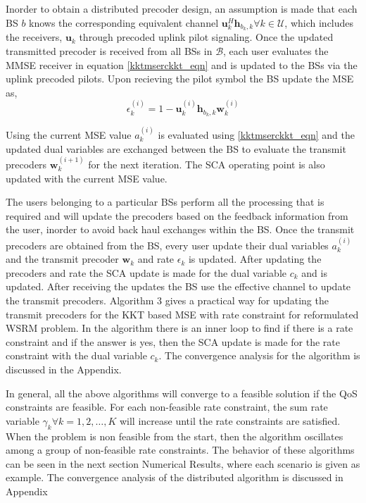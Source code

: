 \documentclass[a4paper, 12pt,titlepage]{dithesis} %
\newcommand{\me}[1]{\( #1 \)}
\begin{document}
Inorder to obtain a distributed precoder design, an assumption is made that each \ac{BS} \me{b} knows the corresponding equivalent channel \me{\mathbf{u}_k^H \mathbf{h}_{{b_k},k} \forall k \in \mathcal{U}}, which includes the receivers, \me{\mathbf{u}_k} through precoded uplink pilot signaling. Once the updated transmitted precoder is received from all \ac{BS}s in \me{\mathcal{B}}, each user evaluates the \ac{MMSE} receiver in equation \eqref{kktmserckkt_eqn} and is updated to the \ac{BS}s via the uplink precoded pilots. Upon recieving the pilot symbol the \ac{BS} update the \ac{MSE} as,
\begin{equation}
\epsilon_k^{(i)} = 1 - \mathbf{u}_k^{(i)} \mathbf{h}_{{b_k},k} \mathbf{w}_k^{(i)}
\label{kktmserc5_eqn}
\end{equation}

Using the current \ac{MSE} value \me{a_k^{(i)}} is evaluated using \eqref{kktmserckkt_eqn} and the updated dual variables are exchanged between the \ac{BS} to evaluate the transmit precoders \me{\mathbf{w}_k^{(i + 1)}} for the next iteration. The \ac{SCA} operating point is also updated with the current \ac{MSE} value.

The users belonging to a particular \ac{BS}s perform all the processing that is required and will update the precoders based on the feedback information from the user, inorder to avoid back haul exchanges within the \ac{BS}. Once the transmit precoders are obtained from the \ac{BS}, every user update their dual variables \me{a_k^{(i)}} and the transmit precoder \me{\mathbf{w}_k} and rate \me{\epsilon_k} is updated. After updating the precoders and rate the \ac{SCA} update is made for the dual variable \me{c_k} and is updated. After receiving the updates the \ac{BS} use the effective channel to update the transmit precoders. Algorithm 3 gives a practical way for updating the transmit precoders for the \ac{KKT} based MSE with rate constraint for reformulated \ac{WSRM} problem. In the algorithm there is an inner loop to find if there is a rate constraint and if the answer is yes, then the \ac{SCA} update is made for the rate constraint with the dual variable \me{c_k}. The convergence analysis for the algorithm is discussed in the Appendix.

In general, all the above algorithms will converge to a feasible solution if the QoS constraints are feasible. For each non-feasible rate constraint, the sum rate variable \me{\gamma_k \forall k = 1,2,\dotsc,K} will increase until the rate constraints are satisfied. When the problem is non feasible from the start, then the algorithm oscillates among a group of non-feasible rate constraints. The behavior of these algorithms can be seen in the next section Numerical Results, where each scenario is given as example. The convergence analysis of the distributed algorithm is discussed in Appendix 
\end{document}
